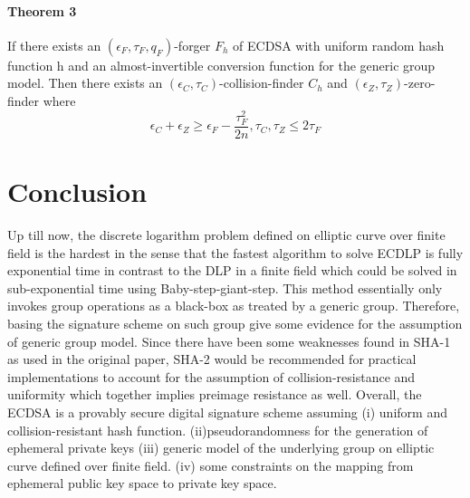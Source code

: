 \documentclass[18]{article}
\begin{document}
\paragraph{Theorem 3}
If there exists an $(\epsilon_F,\tau_F,q_F)$-forger $F_h$ of ECDSA with uniform random hash function h and an almost-invertible conversion function for the generic group model. Then there exists an $(\epsilon_C,\tau_C)$-collision-finder $C_h$ and $(\epsilon_Z,\tau_Z)$-zero-finder where
\begin{equation*}
\epsilon_C+\epsilon_Z \ge \epsilon_F -\frac{\tau_F^2}{2n}, \tau_C,\tau_Z \le 2\tau_F
\end{equation*}
\section{Conclusion}
Up till now, the discrete logarithm problem
defined on elliptic curve over finite field is the hardest in the sense that the fastest algorithm to solve ECDLP is fully exponential time in contrast to the DLP in a finite field which could be
solved in sub-exponential time using Baby-step-giant-step. This method essentially only invokes group operations as a black-box as treated by a generic group.
Therefore, basing the signature scheme on such group give some evidence for the assumption of generic group model.
Since there have been some weaknesses found in SHA-1 as used in the original paper, SHA-2 would be recommended for practical implementations to account for the assumption of collision-resistance and uniformity which together implies preimage resistance as well.
Overall, the ECDSA is a provably secure digital signature scheme assuming (i) uniform and collision-resistant hash function. (ii)pseudorandomness for the generation of ephemeral private keys
(iii) generic model of the underlying group on elliptic curve defined over finite field. (iv) some constraints on the mapping from ephemeral public key space to private key space.

\newpage


\end{document}
